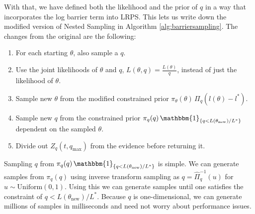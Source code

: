 \documentclass[12pt, a4paper]{report}
\begin{document}
With that, we have defined both the likelihood and the prior of $q$ in a way that incorporates the log barrier term into LRPS.
This lets us write down the modified version of Nested Sampling in Algorithm \ref{alg:barriersampling}.
The changes from the original are the following:
\begin{enumerate}
    \item For each starting $\theta$, also sample a $q$.
    \item Use the joint likelihoods of $\theta$ and $q$, $L(\theta, q) = \frac{L(\theta)}{q}$, instead of just the likelihood of $\theta$.
    \item Sample new $\theta$ from the modified constrained prior $\pi_\theta(\theta) \, \Pi_q(l(\theta) - l^*)$.
    \item Sample new $q$ from the constrained prior $\pi_q(q) \, \mathbbm{1}_{\{q < L(\theta_{\textrm{new}}) / L^*\}}$ dependent on the sampled $\theta$.
    \item Divide out $Z_q(t, q_{\textrm{max}})$ from the evidence before returning it.
\end{enumerate}
\vspace{0.25cm}

Sampling $q$ from $\pi_q(q) \, \mathbbm{1}_{\{q < L(\theta_{\textrm{new}}) / L^*\}}$ is simple.
We can generate samples from $\pi_q(q)$ using inverse transform sampling \cite[23]{bayesian_data_analysis} as $q = \hat{\Pi}^{-1}_q(u)$ for $u \sim \textrm{Uniform}(0,1)$.
Using this we can generate samples until one satisfies the constraint of $q < L(\theta_{\textrm{new}}) / L^*$.
Because $q$ is one-dimensional, we can generate millions of samples in milliseconds and need not worry about performance issues.
\end{document}
